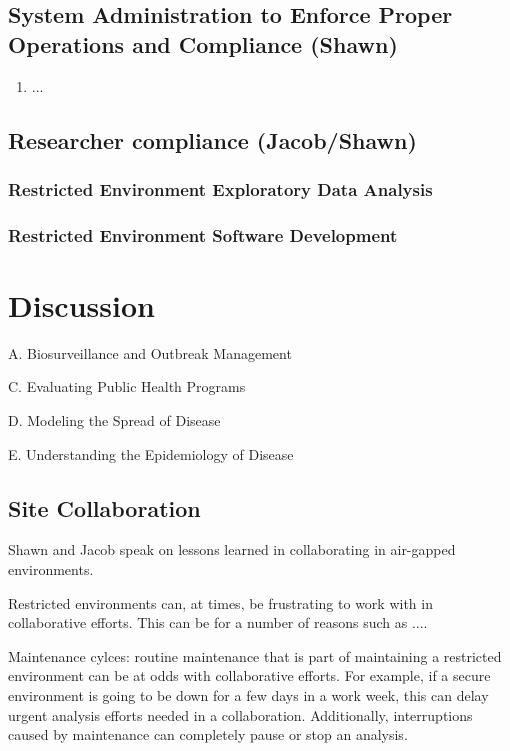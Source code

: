 \documentclass{amia}
\begin{document}
\subsection{System Administration to Enforce Proper Operations and Compliance (Shawn)}

        \begin{enumerate}
            \item ...
        \end{enumerate}


\subsection{Researcher compliance (Jacob/Shawn)}
        
\subsubsection{Restricted Environment Exploratory Data Analysis}

\subsubsection{Restricted Environment Software Development }

\section*{Discussion}

A. Biosurveillance and Outbreak Management 

C. Evaluating Public Health Programs 

D. Modeling the Spread of Disease 

E. Understanding the Epidemiology of Disease 

\subsection*{Site Collaboration}

Shawn and Jacob speak on lessons learned in collaborating in air-gapped environments. 

Restricted environments can, at times, be frustrating to work with in collaborative efforts. This can be for a number of reasons such as ....

Maintenance cylces: routine maintenance that is part of maintaining a restricted environment can be at odds with collaborative efforts. For example, if a secure environment is going to be down for a few days in a work week, this can delay urgent analysis efforts needed in a collaboration. Additionally, interruptions caused by maintenance can completely pause or stop an analysis. 
\end{document}
